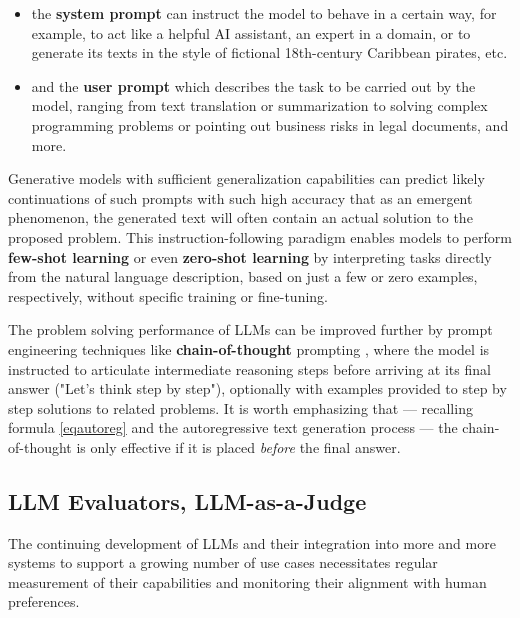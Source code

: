 \documentclass[UTF8,noindent,nohyp,parspace,titlepage,a4paper,12pt]{article}
\begin{document}
      \begin{itemize}
        \item the \textbf{system prompt} can instruct the model to behave in a
              certain way, for example, to act like a helpful AI assistant,
              an expert in a domain, or to generate its texts in the style of
              fictional 18th-century Caribbean pirates, etc.

        \item and the \textbf{user prompt} which describes the task to be
              carried out by the model, ranging from text translation or
              summarization to solving complex programming problems or pointing
              out business risks in legal documents, and more.
      \end{itemize}

      Generative models with sufficient generalization capabilities can predict
      likely continuations of such prompts with such high accuracy that as an
      emergent phenomenon, the generated text will often contain an actual
      solution to the proposed problem. This instruction-following paradigm
      enables models to perform \textbf{few-shot learning} \cite{gpt3} or even
      \textbf{zero-shot learning} by interpreting tasks directly from the
      natural language description, based on just a few or zero examples,
      respectively, without specific training or fine-tuning.

      The problem solving performance of LLMs can be improved further by
      prompt engineering techniques like \textbf{chain-of-thought} prompting
      \cite{cot,zscot}, where the model is instructed to articulate intermediate
      reasoning steps before arriving at its final answer ("Let's think step by
      step"), optionally with examples provided to step by step solutions to
      related problems. It is worth emphasizing that --- recalling formula
      \ref{eqautoreg} and the autoregressive text generation process --- the
      chain-of-thought is only effective if it is placed \emph{before} the
      final answer.

    \subsection{LLM Evaluators, LLM-as-a-Judge}

      The continuing development of LLMs and their integration into more and
      more systems to support a growing number of use cases necessitates regular
      measurement of their capabilities and monitoring their alignment with
      human preferences.
\end{document}
